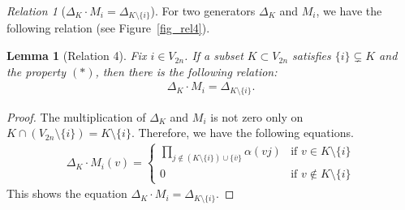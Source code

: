 \documentclass[12pt]{amsart}
\newtheorem{lemma}[theorem]{Lemma}
\theoremstyle{remark}
\newtheorem{relation}{Relation}
\numberwithin{equation}{section}
\begin{document}
\begin{relation}[$\Delta_{K}\cdot M_{i}=\Delta_{K\setminus \{i\}}$]
\label{relation4}
For two generators $\Delta_{K}$ and $M_{i}$, we have the following relation (see Figure~\ref{fig_rel4}).
\begin{lemma}[Relation 4]
\label{lem-for-rel4}
Fix $i\in V_{2n}$.
If a subset $K\subset V_{2n}$ satisfies $\{i\}\subsetneq K$ and the property $(\ast)$,  %
then there is the following relation:
\begin{align}
\label{4th-rel}
\Delta_{K}\cdot M_{i}=\Delta_{K\setminus \{i\}}.
\end{align}
\end{lemma}
\begin{proof}
The multiplication of $\Delta_{K}$ and $M_{i}$ is not zero only on $K\cap (V_{2n}\setminus \{i\})=K\setminus \{i\}$. 
Therefore, we have the following equations.
\begin{align*}
\Delta_{K}\cdot M_{i}(v)
=
\left\{
\begin{array}{ll}
{\displaystyle \prod_{j\not\in (K\setminus \{i\})\cup \{\overline{v}\} }\alpha(vj)} & \text{if $v\in K\setminus \{i\}$} \\
0 & \text{if $v\not\in K\setminus \{i\}$}
\end{array}
\right.
\end{align*}
This shows the equation $\Delta_{K}\cdot M_{i}=\Delta_{K\setminus \{i\}}$.
\end{proof}
\end{relation}
\end{document}
